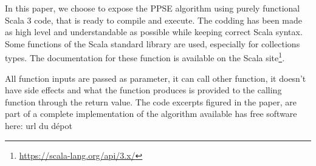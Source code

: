 \documentclass[10pt,letterpaper]{article}
\theoremstyle{definition}
\theoremstyle{remark}
\begin{document}
%
%
%


In this paper, we choose to expose the PPSE algorithm using purely functional Scala 3 code, that is ready to compile and execute.
The codding has been made as high level and understandable as possible while keeping correct Scala syntax.
Some functions of the Scala standard library are used, especially for collections types.
The documentation for these function is available on the Scala site\footnote{\url{https://scala-lang.org/api/3.x/}}.

All function inputs are passed as parameter, it can call other function, it doesn't have side effects and what the function produces is provided to the calling function through the return value. The code excerpts figured in the paper, are part of a complete implementation of the algorithm available has free software here: {\color{red} url du dépot} 


\end{document}
